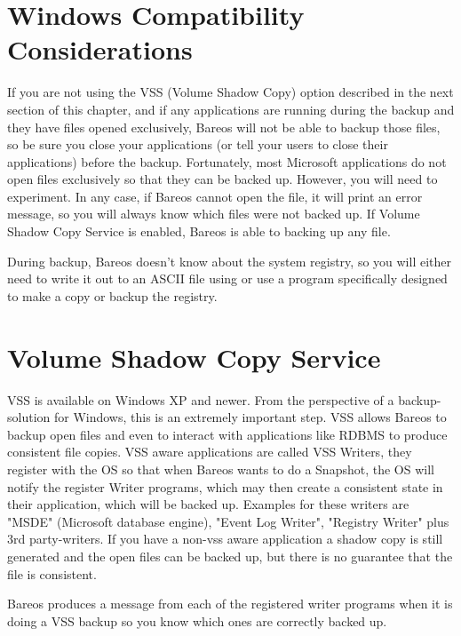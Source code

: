 \section{Windows Compatibility Considerations}
\label{Compatibility}


If you are not using the VSS (Volume Shadow Copy) option described in the
next section of this chapter, and if any applications are running during
the backup and they have files opened exclusively, Bareos will not be able
to backup those files, so be sure you close your applications (or tell your
users to close their applications) before the backup.  Fortunately, most
Microsoft applications do not open files exclusively so that they can be
backed up.  However, you will need to experiment.  In any case, if Bareos
cannot open the file, it will print an error message, so you will always
know which files were not backed up.
If Volume Shadow Copy Service is enabled, Bareos is able to backing up any
file.

During backup, Bareos doesn't know about the system registry, so you will
either need to write it out to an ASCII file using  or use a
program specifically designed to make a copy or backup the registry.



\section{Volume Shadow Copy Service}
\label{VSS}

VSS is available on Windows XP and newer. From the perspective of
a backup-solution for Windows, this is an extremely important step. VSS
allows Bareos to backup open files and even to interact with applications like
RDBMS to produce consistent file copies. VSS aware applications are called
VSS Writers, they register with the OS so that when Bareos wants to do a
Snapshot, the OS will notify the register Writer programs, which may then
create a consistent state in their application, which will be backed up.
Examples for these writers are "MSDE" (Microsoft database
engine), "Event Log Writer", "Registry Writer" plus 3rd
party-writers.  If you have a non-vss aware application a shadow copy is still generated
and the open files can be backed up, but there is no guarantee
that the file is consistent.

Bareos produces a message from each of the registered writer programs
when it is doing a VSS backup so you know which ones are correctly backed
up.

